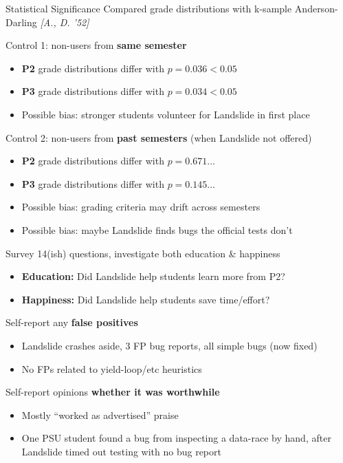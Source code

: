 \documentclass[xcolor=dvipsnames]{beamer}
\begin{document}
\begin{frame}{Statistical Significance}
	Compared %
	grade distributions with k-sample Anderson-Darling {\em [A., D. '52]}
	\linegap

	Control 1: non-users from {\bf same semester}
	\begin{itemize}
		\item {\bf P2} grade distributions differ with $p = 0.036 < 0.05$
		\item {\bf P3} grade distributions differ with $p = 0.034 < 0.05$
			\pause
		\item Possible bias: stronger students volunteer for Landslide in first place
	\end{itemize}
	\pause
	\linegap

	Control 2: non-users from {\bf past semesters} (when Landslide not offered)
	\begin{itemize}
		\item {\bf P2} grade distributions differ with $p = 0.671$...
		\item {\bf P3} grade distributions differ with $p = 0.145$...
			\pause
		\item Possible bias: grading criteria may drift across semesters
		\item Possible bias: maybe Landslide finds bugs the official tests don't
	\end{itemize}
\end{frame}

\begin{frame}{Survey}
	14(ish) questions, investigate both education \& happiness
	\begin{itemize}
		\item {\bf Education:} Did Landslide help students learn more from P2?
		\item {\bf Happiness:} Did Landslide help students save time/effort?
	\end{itemize}
	\pause
	\linegap

	Self-report any {\bf false positives}
	\begin{itemize}
		\item Landslide crashes aside, 3 FP bug reports, all simple bugs (now fixed)
		\item No FPs related to yield-loop/etc heuristics
	\end{itemize}
	\linegap

	Self-report opinions {\bf whether it was worthwhile}
	\begin{itemize}
		\item Mostly ``worked as advertised'' praise
		\item One PSU student found a bug from inspecting a data-race by hand,
			after Landslide timed out testing with no bug report
	\end{itemize}
\end{frame}
\end{document}
